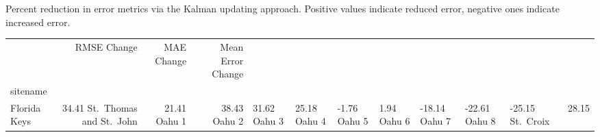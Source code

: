 \caption{Percent reduction in error metrics via the Kalman updating approach. Positive values indicate reduced error, negative ones indicate increased error.}
\label{tab:oahu-percent-change}
\begin{tabular}{lrrr}
\toprule
 & RMSE Change & MAE Change & Mean Error Change \\
sitename &  &  &  \\
\midrule
Florida Keys & 34.41%
St.~Thomas and St.~John & 21.41%
Oahu 1 & 38.43%
Oahu 2 & 31.62%
Oahu 3 & 25.18%
Oahu 4 & -1.76%
Oahu 5 & 1.94%
Oahu 6 & -18.14%
Oahu 7 & -22.61%
Oahu 8 & -25.15%
St.~Croix & 28.15%
\bottomrule
\end{tabular}

